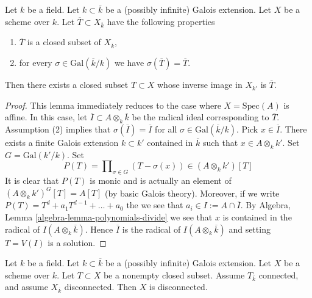 \begin{lemma}
\label{lemma-closed-fixed-by-Galois}
Let $k$ be a field. Let $k \subset \overline{k}$ be a (possibly infinite)
Galois extension. Let $X$ be a scheme over $k$. Let
$\overline{T} \subset X_{\overline{k}}$ have the following properties
\begin{enumerate}
\item $\overline{T}$ is a closed subset of $X_{\overline{k}}$,
\item for every $\sigma \in \text{Gal}(\overline{k}/k)$
we have $\sigma(\overline{T}) = \overline{T}$.
\end{enumerate}
Then there exists a closed subset $T \subset X$ whose inverse image
in $X_{k'}$ is $\overline{T}$.
\end{lemma}

\begin{proof}
This lemma immediately reduces to the case where $X = \text{Spec}(A)$
is affine. In this case, let $\overline{I} \subset A \otimes_k \overline{k}$
be the radical ideal corresponding to $\overline{T}$.
Assumption (2) implies that $\sigma(\overline{I}) = \overline{I}$
for all $\sigma \in \text{Gal}(\overline{k}/k)$.
Pick $x \in \overline{I}$. There exists a finite Galois extension
$k \subset k'$ contained in $\overline{k}$ such that $x \in A \otimes_k k'$.
Set $G = \text{Gal}(k'/k)$. Set
$$
P(T) = \prod\nolimits_{\sigma \in G} (T - \sigma(x)) \in (A \otimes_k k')[T]
$$
It is clear that $P(T)$ is monic and is actually an element of
$(A \otimes_k k')^G[T] = A[T]$ (by basic Galois theory).
Moreover, if we write $P(T) = T^d + a_1T^{d - 1} + \ldots + a_0$
the we see that $a_i \in I := A \cap \overline{I}$. By
Algebra, Lemma \ref{algebra-lemma-polynomials-divide}
we see that $x$ is contained in the radical of $I(A \otimes_k \overline{k})$.
Hence $\overline{I}$ is the radical of $I(A \otimes_k \overline{k})$ and
setting $T = V(I)$ is a solution.
\end{proof}

\begin{lemma}
\label{lemma-tricky}
Let $k$ be a field. Let $k \subset \overline{k}$ be a (possibly infinite)
Galois extension. Let $X$ be a scheme over $k$. Let $T \subset X$ be
a nonempty closed subset. Assume $T_{\overline{k}}$ connected, and
assume $X_{\overline{k}}$ disconnected. Then $X$ is disconnected.
\end{lemma}

